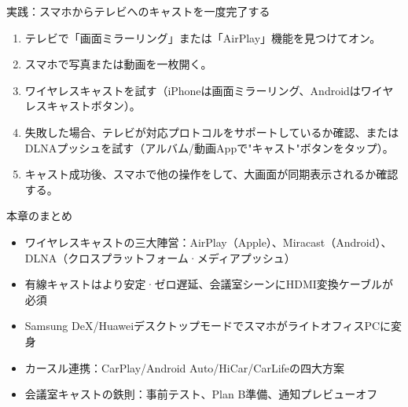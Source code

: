 \begin{tcbpractice}{実践：スマホからテレビへのキャストを一度完了する}
\begin{enumerate}
  \item テレビで「画面ミラーリング」または「AirPlay」機能を見つけてオン。
  \item スマホで写真または動画を一枚開く。
  \item ワイヤレスキャストを試す（iPhoneは画面ミラーリング、Androidはワイヤレスキャストボタン）。
  \item 失敗した場合、テレビが対応プロトコルをサポートしているか確認、またはDLNAプッシュを試す（アルバム/動画Appで"キャスト"ボタンをタップ）。
  \item キャスト成功後、スマホで他の操作をして、大画面が同期表示されるか確認する。
\end{enumerate}

\end{tcbpractice}

\begin{tcbsummary}{本章のまとめ}
\begin{itemize}
  \item ワイヤレスキャストの三大陣営：AirPlay（Apple）、Miracast（Android）、DLNA（クロスプラットフォーム·メディアプッシュ）
  \item 有線キャストはより安定·ゼロ遅延、会議室シーンにHDMI変換ケーブルが必須
  \item Samsung DeX/HuaweiデスクトップモードでスマホがライトオフィスPCに変身
  \item カースル連携：CarPlay/Android Auto/HiCar/CarLifeの四大方案
  \item 会議室キャストの鉄則：事前テスト、Plan B準備、通知プレビューオフ
\end{itemize}

\end{tcbsummary}
